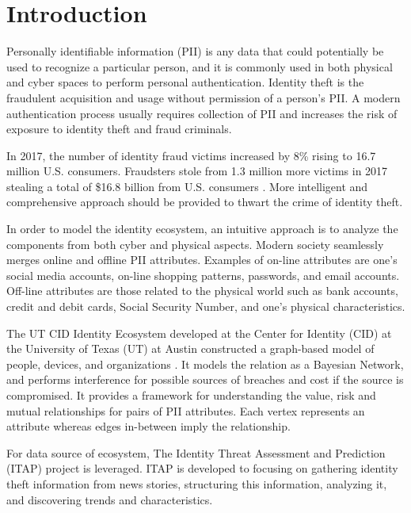 \documentclass[conference]{IEEEtran}
\begin{document}
\section{Introduction}
 Personally identifiable information (PII) is any data that could potentially be used to recognize a particular person, and it is commonly used in both physical and cyber spaces to perform personal authentication. Identity theft is the fraudulent acquisition and usage without permission of a person's PII. A modern authentication process usually requires collection of PII and increases the risk of exposure to identity theft and fraud criminals.

In 2017, the number of identity fraud victims increased by 8\% rising to 16.7 million U.S. consumers. Fraudsters stole from 1.3 million more victims in 2017 stealing a total of \$16.8 billion from U.S. consumers \cite{Pascual}. More intelligent and comprehensive approach should be provided to thwart the crime of identity theft.


In order to model the identity ecosystem, an intuitive  approach is to analyze the components from both cyber and physical aspects. Modern society  seamlessly merges online and offline PII attributes. Examples of on-line attributes are one's social media accounts, on-line shopping patterns, passwords, and email accounts. Off-line attributes are those related to the physical world such as bank accounts, credit and debit cards, Social Security Number, and one's physical characteristics.

 The UT CID Identity Ecosystem developed at the Center for Identity (CID) at the University of Texas (UT) at Austin constructed a graph-based model of people, devices, and organizations \cite{EcosystemModeling}. It models the relation as a Bayesian Network, and performs interference for possible sources of breaches and cost if the source is compromised.
It provides a framework for understanding the value, risk and mutual relationships for pairs of PII attributes. Each vertex represents an attribute whereas edges in-between imply the relationship.

For data source of ecosystem, The Identity Threat Assessment and Prediction (ITAP) \cite{ITAPDataSource} project is leveraged. ITAP is developed to focusing on gathering identity theft information from news stories, structuring this information, analyzing it, and discovering trends and characteristics.
\end{document}
